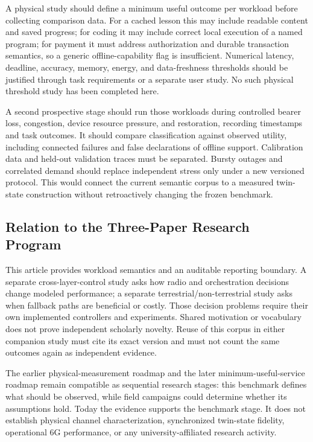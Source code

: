 A physical study should define a minimum useful outcome per workload before collecting comparison data. For a cached lesson this may include readable content and saved progress; for coding it may include correct local execution of a named program; for payment it must address authorization and durable transaction semantics, so a generic offline-capability flag is insufficient. Numerical latency, deadline, accuracy, memory, energy, and data-freshness thresholds should be justified through task requirements or a separate user study. No such physical threshold study has been completed here.

A second prospective stage should run those workloads during controlled bearer loss, congestion, device resource pressure, and restoration, recording timestamps and task outcomes. It should compare classification against observed utility, including connected failures and false declarations of offline support. Calibration data and held-out validation traces must be separated. Bursty outages and correlated demand should replace independent stress only under a new versioned protocol. This would connect the current semantic corpus to a measured twin-state construction without retroactively changing the frozen benchmark.

\subsection{Relation to the Three-Paper Research Program}
This article provides workload semantics and an auditable reporting boundary. A separate cross-layer-control study asks how radio and orchestration decisions change modeled performance; a separate terrestrial/non-terrestrial study asks when fallback paths are beneficial or costly. Those decision problems require their own implemented controllers and experiments. Shared motivation or vocabulary does not prove independent scholarly novelty. Reuse of this corpus in either companion study must cite its exact version and must not count the same outcomes again as independent evidence.

The earlier physical-measurement roadmap and the later minimum-useful-service roadmap remain compatible as sequential research stages: this benchmark defines what should be observed, while field campaigns could determine whether its assumptions hold. Today the evidence supports the benchmark stage. It does not establish physical channel characterization, synchronized twin-state fidelity, operational 6G performance, or any university-affiliated research activity.

